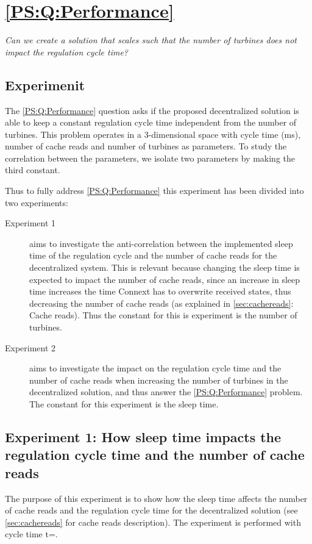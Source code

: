 
\section{\ref{PS:Q:Performance}}

\textit{Can we create a solution that scales such that the number of turbines does not impact the regulation cycle time?}

\subsection{Experimenit}
\label{sec:Exper:perfom}


The \ref{PS:Q:Performance} question asks if the proposed decentralized solution is able to keep a constant regulation cycle time independent from the number of turbines. This problem operates in a 3-dimensional space with cycle time (ms), number of cache reads and number of turbines as parameters. To study the correlation between the parameters, we isolate two parameters by making the third constant.

Thus to fully address \ref{PS:Q:Performance} this experiment has been divided into two experiments:
 
\begin{description}
	\item[Experiment 1] aims to investigate the anti-correlation between the implemented sleep time of the regulation cycle and the number of cache reads for the decentralized system. This is relevant because changing the sleep time is expected to impact the number of cache reads, since an increase in sleep time increases the time Connext has to overwrite received states, thus decreasing the number of cache reads (as explained in \cref{sec:cachereads}: Cache reads). Thus the constant for this is experiment is the number of turbines.
	\item[Experiment 2] aims to investigate the impact on the regulation cycle time and the number of cache reads when increasing the number of turbines in the decentralized solution, and thus answer the \ref{PS:Q:Performance} problem. The constant for this experiment is the sleep time.
\end{description}


\subsection{Experiment 1: How sleep time impacts the regulation cycle time and the number of cache reads}
\label{subsec:Exper:perfom:1}
The purpose of this experiment is to show how the sleep time affects the number of cache reads and the regulation cycle time for the decentralized solution (see \cref{sec:cachereads} for cache reads description).  
The experiment is performed with cycle time t=\testCycletimeNumbers.  

